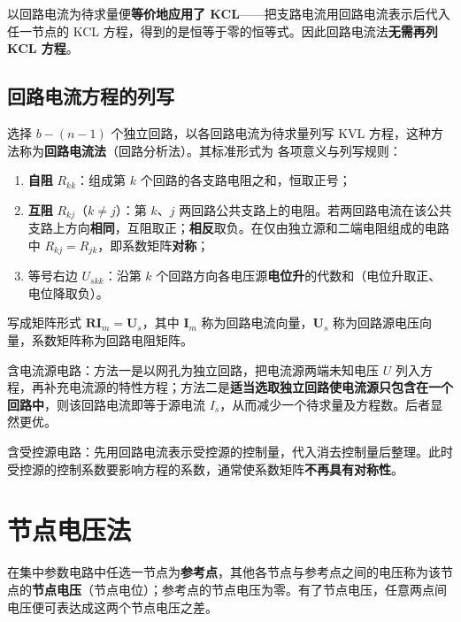 以回路电流为待求量便\textbf{等价地应用了 KCL}——把支路电流用回路电流表示后代入任一节点的 KCL 方程，得到的是恒等于零的恒等式。因此回路电流法\textbf{无需再列 KCL 方程}。

\subsection{回路电流方程的列写}
选择 $b-(n-1)$ 个独立回路，以各回路电流为待求量列写 KVL 方程，这种方法称为\textbf{回路电流法}（回路分析法）。其标准形式为
各项意义与列写规则：
\begin{enumerate}
  \item \textbf{自阻} $R_{kk}$：组成第 $k$ 个回路的各支路电阻之和，恒取正号；
  \item \textbf{互阻} $R_{kj}$（$k\neq j$）：第 $k$、$j$ 两回路公共支路上的电阻。若两回路电流在该公共支路上方向\textbf{相同}，互阻取正；\textbf{相反}取负。在仅由独立源和二端电阻组成的电路中 $R_{kj}=R_{jk}$，即系数矩阵\textbf{对称}；
  \item 等号右边 $U_{skk}$：沿第 $k$ 个回路方向各电压源\textbf{电位升}的代数和（电位升取正、电位降取负）。
\end{enumerate}
写成矩阵形式 $\boldsymbol{RI}_m=\boldsymbol{U}_s$，其中 $\boldsymbol{I}_m$ 称为回路电流向量，$\boldsymbol{U}_s$ 称为回路源电压向量，系数矩阵称为回路电阻矩阵。

含电流源电路：方法一是以网孔为独立回路，把电流源两端未知电压 $U$ 列入方程，再补充电流源的特性方程；方法二是\textbf{适当选取独立回路使电流源只包含在一个回路中}，则该回路电流即等于源电流 $I_s$，从而减少一个待求量及方程数。后者显然更优。

含受控源电路：先用回路电流表示受控源的控制量，代入消去控制量后整理。此时受控源的控制系数要影响方程的系数，通常使系数矩阵\textbf{不再具有对称性}。


\section{节点电压法}
在集中参数电路中任选一节点为\textbf{参考点}，其他各节点与参考点之间的电压称为该节点的\textbf{节点电压}（节点电位）；参考点的节点电压为零。有了节点电压，任意两点间电压便可表达成这两个节点电压之差。


